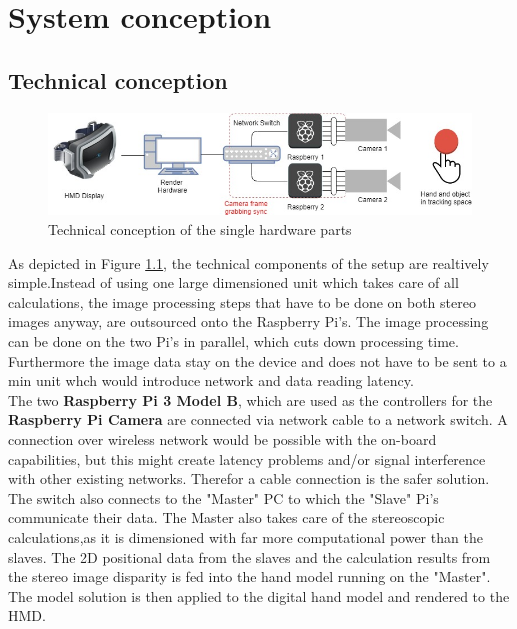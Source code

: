 \chapter{System conception}\section{Technical conception}
\begin{figure}[H]
\includegraphics[width=\textwidth]{images/technical_setup.jpg}
\caption{Technical conception of the single hardware parts}
\label{fig:technical-copnception}
\end{figure} 
As depicted in Figure \ref{fig:technical-copnception}, the technical components of the setup are realtively simple.Instead of using one large dimensioned unit which takes care of all calculations, the image processing steps that have to be done on both stereo images anyway, are outsourced onto the Raspberry Pi's.
The image processing can be done on the two Pi's in parallel, which cuts down processing time. Furthermore the image data stay on the device and does not have to be sent to a min unit whch would introduce network and data reading latency.\\
The two \textbf{Raspberry Pi 3 Model B}, which are used as the controllers for the \textbf{Raspberry Pi Camera} are connected via network cable to a network switch. A connection over wireless network would be possible with the on-board capabilities, but this might create latency problems and/or signal interference with other existing networks. Therefor a cable connection is the safer solution.
The switch also connects to the "Master" PC to which the "Slave" Pi's communicate their data. The Master also takes care of the stereoscopic calculations,as it is dimensioned with far more computational power than the slaves. The 2D positional data from the slaves and the calculation results from the stereo image disparity is fed into the hand model running on the "Master". The model solution is then applied to the digital hand model and rendered to the HMD.
\newpage
